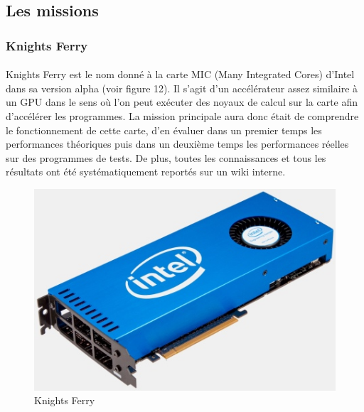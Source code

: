 \documentclass[11pt]{article}
\begin{document}
		\subsection{Les missions}
			\subsubsection{Knights Ferry}
				\paragraph{}
				Knights Ferry est le nom donné à la carte MIC (Many Integrated Cores) d'Intel dans sa version alpha (voir figure 12). Il s'agit 
				d'un accélérateur assez similaire à un GPU dans le sens où l'on peut exécuter des noyaux de calcul sur la 
				carte afin d'accélérer les programmes. La mission principale aura donc était de comprendre le fonctionnement de cette
				carte, d'en évaluer dans un premier temps les performances théoriques puis dans un deuxième temps les 
				performances réelles sur des programmes de tests. De plus, toutes les connaissances et tous les résultats ont 
				été systématiquement reportés sur un wiki interne.
				\begin{figure}
				\begin{center}
				\includegraphics[scale=0.75]{IntelMIC.jpg}
				\caption{Knights Ferry}
				\end{center}
				\end{figure}
\end{document}
